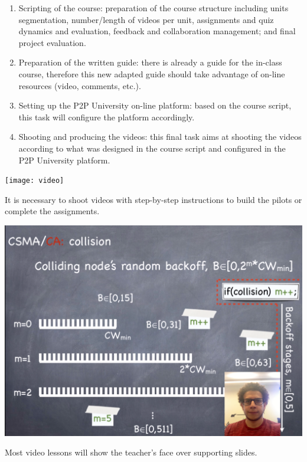 \documentclass{tufte-book} %
\begin{document}
\begin{enumerate}
	\item Scripting of the course: preparation of the course structure including units segmentation, number/length of videos per unit, assignments and quiz dynamics and evaluation, feedback and collaboration management; and final project evaluation.
	\item Preparation of the written guide: there is already a guide for the in-class course, therefore this new adapted guide should take advantage of on-line resources (video, comments, etc.).
	\item Setting up the P2P University on-line platform: based on the course script, this task will configure the platform accordingly.
	\item Shooting and producing the videos: this final task aims at shooting the videos according to what was designed in the course script and configured in the P2P University platform.
\end{enumerate}



\begin{marginfigure}
\texttt{[image: video]}
\caption{It is necessary to shoot videos with step-by-step instructions to build the pilots or complete the assignments.}
\label{fig:video}
\end{marginfigure}
\begin{marginfigure}
\includegraphics[width=\linewidth]{lesson}
\caption{Most video lessons will show the teacher's face over supporting slides.}
\label{fig:lesson}
\end{marginfigure}
\end{document}
